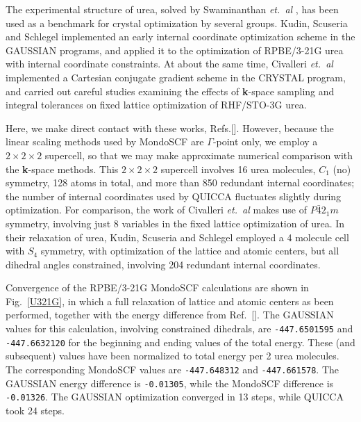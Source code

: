 \twolinestyle{\documentclass[prb,preprint]{revtex4}}
\begin{document}
The experimental structure of urea, solved by Swaminanthan {\em et.~al} \cite{SSwaminathan84},
has been used as a benchmark for crystal optimization by several groups.  
Kudin, Scuseria and Schlegel \cite{KKudin01} implemented an early internal coordinate 
optimization scheme in the GAUSSIAN programs, and applied it to the optimization of
RPBE/3-21G urea with internal coordinate constraints.  At about the same time,  
Civalleri {\em et.~al} \cite{BCivalleri01} implemented a Cartesian conjugate gradient 
scheme in the CRYSTAL program, and carried out careful studies examining the effects of 
{\bf k}-space sampling and integral tolerances on fixed lattice optimization of RHF/STO-3G urea.

Here, we make direct contact with these works, Refs.[].
However, because the linear scaling methods used by {\sc MondoSCF} are $\Gamma$-point only, 
we employ a $2\times2\times2$ supercell, so that we may make approximate numerical 
comparison with the {\bf k}-space methods.  This $2\times2\times2$ supercell involves 
16 urea molecules, $C_1$ (no) symmetry, 128 atoms in total, and more than 850 redundant internal 
coordinates;  the number of internal coordinates used by QUICCA fluctuates slightly during optimization.  
For comparison, the work of Civalleri {\em et.~al} \cite{BCivalleri01} makes use of $P\bar{4}2_1m$ 
symmetry, involving just 8 variables in the fixed lattice optimization of urea.  In their 
relaxation of urea, Kudin, Scuseria and Schlegel \cite{KKudin01} 
employed a 4 molecule cell with $S_4$ symmetry, with optimization of the lattice and 
atomic centers, but all dihedral angles constrained, involving 204 redundant internal 
coordinates.

Convergence of the RPBE/3-21G {\sc MondoSCF} calculations are shown in Fig.~\ref{U321G}, 
in which a full relaxation of lattice and atomic centers as been performed, together
with the energy difference from Ref.~[]. The {\sc GAUSSIAN} values for this 
calculation, involving constrained dihedrals, are {\tt -447.6501595} and {\tt -447.6632120} for the 
beginning and ending values of the total energy.  These (and subsequent) values have been normalized to 
total energy per 2 urea molecules.  The corresponding {\sc MondoSCF} values are {\tt -447.648312} 
and {\tt -447.661578}. The {\sc GAUSSIAN} energy difference is {\tt -0.01305}, while 
the {\sc MondoSCF} difference is {\tt -0.01326}.   The {\sc GAUSSIAN} optimization converged 
in 13 steps, while QUICCA took 24 steps.
\end{document}
